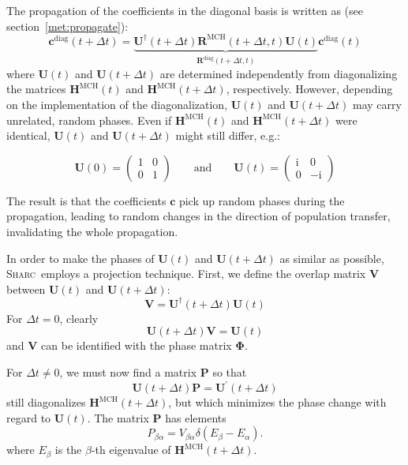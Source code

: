 \documentclass[a4paper,11pt,DIV=15,openany,twoside=false]{scrbook}
\newcommand{\ttmdump}[1]{#1}
\newcommand{\sharc}{\textsc{Sharc}}
\newcommand{\I}{\ensuremath{\mathrm{i}}}
\newcommand{\VEC}[1]{\ensuremath{\mathbf{#1}}}
\begin{document}
The propagation of the coefficients in the diagonal basis is written as (see section~\ref{met:propagate}):
\begin{equation}
  \VEC{c}^{\text{diag}}(t+\Delta t)=\underbrace{\VEC{U}^\dagger(t+\Delta t)\VEC{R}^{\text{MCH}}(t+\Delta t,t)\VEC{U}(t)}_{\VEC{R}^{\text{diag}}(t+\Delta t,t)}\VEC{c}^{\text{diag}}(t)
\end{equation}
where $\VEC{U}(t)$ and $\VEC{U}(t+\Delta t)$ are determined independently from diagonalizing the matrices $\VEC{H}^{\text{MCH}}(t)$ and $\VEC{H}^{\text{MCH}}(t+\Delta t)$, respectively. However, depending on the implementation of the diagonalization, $\VEC{U}(t)$ and $\VEC{U}(t+\Delta t)$ may carry unrelated, random phases. Even if $\VEC{H}^{\text{MCH}}(t)$ and $\VEC{H}^{\text{MCH}}(t+\Delta t)$ were identical, $\VEC{U}(t)$ and $\VEC{U}(t+\Delta t)$ might still differ, e.g.:
\ttmdump{
  \begin{equation}
    \VEC{U}(0)=
    \begin{pmatrix}1&0\\0&1\end{pmatrix}
    \qquad\text{and}\qquad 
    \VEC{U}(t)=
    \begin{pmatrix}\I&0\\0&-\I\end{pmatrix}
  \end{equation}
}
The result is that the coefficients $\VEC{c}$ pick up random phases during the propagation, leading to random changes in the direction of population transfer, invalidating the whole propagation.

In order to make the phases of $\VEC{U}(t)$ and $\VEC{U}(t+\Delta t)$ as similar as possible, \sharc\ employs a projection technique. First, we define the overlap matrix $\VEC{V}$ between $\VEC{U}(t)$ and $\VEC{U}(t+\Delta t)$:
\begin{equation}
  \VEC{V}=\VEC{U}^\dagger(t+\Delta t)\VEC{U}(t)
\end{equation}
For $\Delta t=0$, clearly
\begin{equation}
  \VEC{U}(t+\Delta t)\VEC{V}=\VEC{U}(t)
\end{equation}
and $\VEC{V}$ can be identified with the phase matrix $\boldsymbol{\Phi}$.

For $\Delta t\neq 0$, we must now find a matrix $\VEC{P}$ so that
\begin{equation}
  \VEC{U}(t+\Delta t)\VEC{P}=\VEC{U}^\prime(t+\Delta t)
\end{equation}
still diagonalizes $\VEC{H}^{\text{MCH}}(t+\Delta t)$, but which minimizes the phase change with regard to $\VEC{U}(t)$.
The matrix $\VEC{P}$ has elements
\begin{equation}
  P_{\beta\alpha}=V_{\beta\alpha}
  \delta\left(
    E_\beta-E_\alpha
  \right).
\end{equation}
where $E_\beta$ is the $\beta$-th eigenvalue of $\VEC{H}^{\text{MCH}}(t+\Delta t)$.
\end{document}
